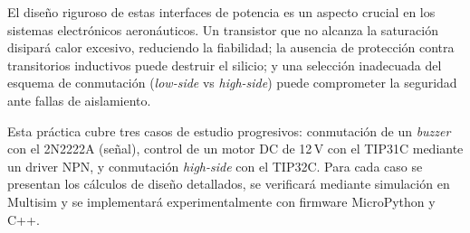 \documentclass[11pt]{article}
\begin{document}
El diseño riguroso de estas interfaces de potencia es un aspecto crucial en los sistemas
electrónicos aeronáuticos. Un transistor que no alcanza la saturación disipará calor
excesivo, reduciendo la fiabilidad; la ausencia de protección contra transitorios
inductivos puede destruir el silicio; y una selección inadecuada del esquema de
conmutación (\emph{low-side} vs \emph{high-side}) puede comprometer la seguridad ante
fallas de aislamiento.

Esta práctica cubre tres casos de estudio progresivos: conmutación de un \emph{buzzer}
con el 2N2222A (señal), control de un motor DC de 12\,V con el TIP31C mediante un driver
NPN, y conmutación \emph{high-side} con el TIP32C. Para cada caso se presentan los
cálculos de diseño detallados, se verificará mediante simulación en Multisim y se
implementará experimentalmente con firmware MicroPython y C++.

\end{document}
